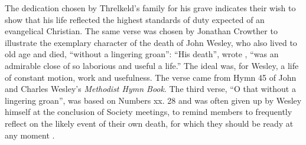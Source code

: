 The dedication chosen by Threlkeld’s family for his grave indicates their wish to show that his life reflected the highest standards of duty expected of an evangelical Christian. The same verse was chosen by Jonathan Crowther to illustrate the exemplary character of the death of John Wesley, who also lived to old age and died, “without a lingering groan”: “His death”, wrote \citet[207]{crowther_portraiture_1815}, “was an admirable close of so laborious and useful a life.” The ideal was, for Wesley, a life of constant motion, work and usefulness. The verse came from Hymn 45 of John and Charles Wesley’s \textit{Methodist Hymn Book}. The third verse, “O that without a lingering groan”, was based on Numbers xx. 28 and was often given up by Wesley himself at the conclusion of Society meetings, to remind members to frequently reflect on the likely event of their own death, for which they should be ready at any moment \citep[39]{stevenson_methodist_1870}.